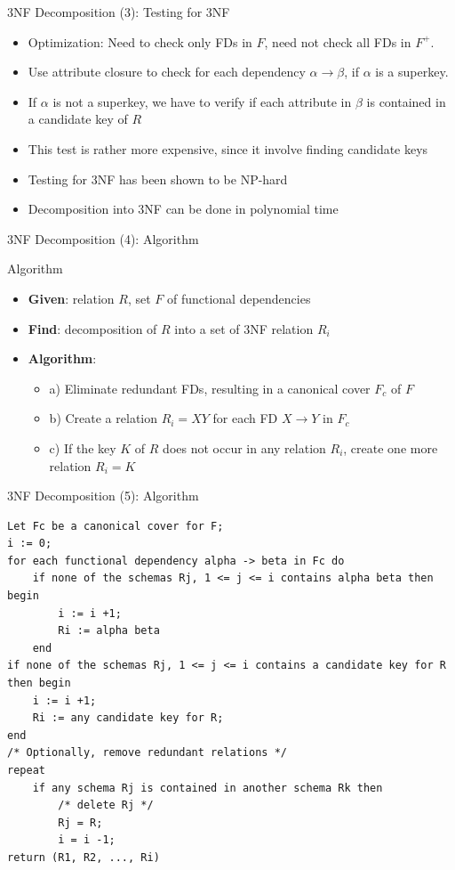 \documentclass[aspectratio=169, xcolor=dvipsnames]{beamer}
\begin{document}
\begin{frame}{3NF Decomposition (3): Testing for 3NF}
    \begin{itemize}[<+->]
        \item Optimization: Need to check only FDs in $F$, need not check all FDs in $F^+$.
        \item Use attribute closure to check for each dependency $\alpha \rightarrow \beta$, if $\alpha$ is a superkey.
        \item If $\alpha$ is not a superkey, we have to verify if each attribute in $\beta$ is contained in a candidate key of $R$
        \item This test is rather more expensive, since it involve finding candidate keys
        \item Testing for 3NF has been shown to be NP-hard
        \item Decomposition into 3NF can be done in polynomial time
    \end{itemize}
\end{frame}

\begin{frame}{3NF Decomposition (4): Algorithm}
    \begin{exampleblock}{Algorithm}
        \begin{itemize}[<+->]
            \item \textbf{Given}: relation $R$, set $F$ of functional dependencies
            \item \textbf{Find}: decomposition of $R$ into a set of 3NF relation $R_i$
            \item \textbf{Algorithm}:
            \begin{itemize}
                \item[$\triangleright$] a) Eliminate redundant FDs, resulting in a canonical cover $F_c$ of $F$
                \item[$\triangleright$] b) Create a relation $R_i = XY$ for each FD $X \rightarrow Y$ in $F_c$
                \item[$\triangleright$] c) If the key $K$ of $R$ does not occur in any relation $R_i$, create one more relation $R_i = K$
            \end{itemize}
        \end{itemize}
    \end{exampleblock}
\end{frame}

\begin{frame}[fragile]{3NF Decomposition (5): Algorithm}
    \begin{verbatim}
Let Fc be a canonical cover for F;
i := 0;
for each functional dependency alpha -> beta in Fc do 
    if none of the schemas Rj, 1 <= j <= i contains alpha beta then begin 
        i := i +1; 
        Ri := alpha beta 
    end 
if none of the schemas Rj, 1 <= j <= i contains a candidate key for R then begin 
    i := i +1; 
    Ri := any candidate key for R; 
end 
/* Optionally, remove redundant relations */ 
repeat 
    if any schema Rj is contained in another schema Rk then 
        /* delete Rj */ 
        Rj = R; 
        i = i -1; 
return (R1, R2, ..., Ri)
    \end{verbatim}
\end{frame}
\end{document}
